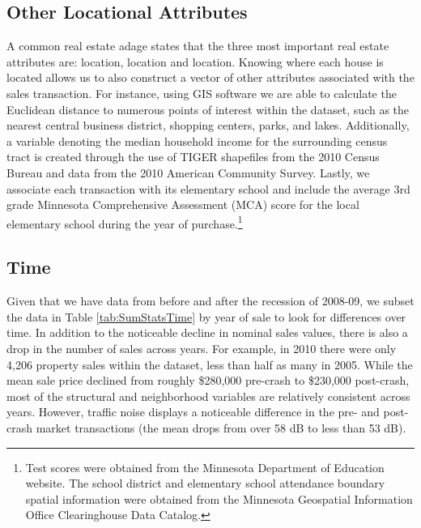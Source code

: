 \documentclass{article}\usepackage[]{graphicx}\usepackage[]{color}
\begin{document}
\subsection{Other Locational Attributes}
A common real estate adage states that the three most important real estate attributes are: location, location and location. Knowing where each house is located allows us to also construct a vector of other attributes associated with the sales transaction. For instance, using GIS software we are able to calculate the Euclidean distance to numerous points of interest within the dataset, such as the nearest central business district, shopping centers, parks, and lakes. Additionally, a variable denoting the median household income for the surrounding census tract is created through the use of TIGER shapefiles from the 2010 Census Bureau and data from the 2010 American Community Survey. Lastly, we associate each transaction with its elementary school and include the average 3rd grade Minnesota Comprehensive Assessment (MCA) score for the local elementary school during the year of purchase.\footnote{Test scores were obtained from the Minnesota Department of Education website. The school district and elementary school attendance boundary spatial information were obtained from the Minnesota Geospatial Information Office Clearinghouse Data Catalog.} 

\subsection{Time}
Given that we have data from before and after the recession of 2008-09, we subset the data in Table \ref{tab:SumStatsTime} by year of sale to look for differences over time. In addition to the noticeable decline in nominal sales values, there is also a drop in the number of sales across years. For example, in 2010 there were only 4,206 property sales within the dataset, less than half as many in 2005. While the mean sale price declined from roughly \$280,000 pre-crash to \$230,000 post-crash, most of the structural and neighborhood variables are relatively consistent across years. However, traffic noise displays a noticeable difference in the pre- and post-crash market transactions (the mean drops from over 58 dB to less than 53 dB). 
\end{document}
